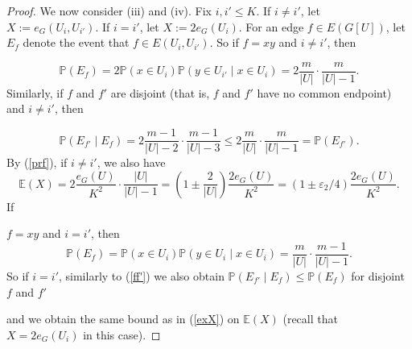 \documentclass{memo-l}
\def\COMMENT#1{}
\def\eps{\varepsilon}
\def\ex{\mathbb{E}}
\def\pr{\mathbb{P}}
\numberwithin{section}{chapter}
\numberwithin{equation}{section}
\numberwithin{firstthm}{section}
\numberwithin{figure}{section}
\begin{document}
\begin{proof}
We now consider (iii) and (iv).
Fix $i,i' \le K$. If $i \neq i'$, let $X:=e_G(U_{i}, U_{i'})$.
If $i = i'$, let $X:=2e_G(U_{i})$.
For an edge $f \in E(G[U])$, let $E_f$ denote the event that $f \in E(U_i, U_{i'})$.
So if $f=xy$ and $i \neq i'$, then%
    \COMMENT{to derive these and other expressions, it's best to view the sample space as the set of all
injective mappings from $U$ to $[|U|]$, where
we assign $x$ to $U_i$ if it is mapped to $[(i-1)m+1,im]$. Then each equipartition has the same number of mappings which produce this equipartition.
So as probability space one can consider the uniform distribution over the above mappings.}
\begin{equation} \label{prf}
\pr (E_f) =2 \pr (x \in U_i) \pr (y \in U_{i'} \mid x \in U_i) = 2 \frac{m}{|U|} \cdot  \frac{m}{|U|-1}.
\end{equation}
Similarly, if $f$ and $f'$ are disjoint (that is, $f$ and $f'$ have no common 
endpoint)\COMMENT{B.Cs: the explanation for disjointness is given here} and $i \neq i'$, then%
   \COMMENT{note $\frac{m-1}{m} \frac{|U|}{|U|-2} \le (1-1/m)(1+3/|U|) \le 1$ and similarly for the second fraction.}
\begin{equation} \label{ff'}
\pr ( E_{f'} \mid E_f )=2\frac{m-1}{|U|-2} \cdot \frac{m-1}{|U|-3} \le 
2\frac{m}{|U|} \cdot \frac{m}{|U|-1} =
\pr ( E_{f'}).
\end{equation}
By (\ref{prf}), if $i \not =i'$, we also have
\begin{equation}  \label{exX}
\ex ( X ) = 2 \frac{e_G(U)}{K^2} \cdot \frac{|U|}{|U|-1}= \left( 1 \pm \frac{2}{|U|} \right) \frac{2e_G(U)}{K^2}= \left( 1 \pm \eps_2/4 \right)\frac{2e_G(U)}{K^2}.
\end{equation}
If%
\COMMENT{Deryk divided by 4 in the final equality as we need this in eq. devex}
$f=xy$ and $i = i'$, then  
\begin{equation} \label{prf2}
\pr (E_f) = \pr (x \in U_i) \pr (y \in U_{i} \mid x \in U_i) =  \frac{m}{|U|} \cdot  \frac{m-1}{|U|-1}.
\end{equation}
So if $i = i'$, similarly to (\ref{ff'}) we also obtain $\pr ( E_{f'} \mid E_f ) \le \pr (E_f)$ for disjoint $f$ and $f'$%
\COMMENT{$\pr ( E_{f'} \mid E_f )=\frac{m-2}{|U|-2} \cdot \frac{m-3}{|U|-3} \le
\frac{m}{|U|} \frac{m-1}{|U|-1} =\pr ( E_{f'}).$}
and we obtain the same bound as in (\ref{exX}) on $\ex ( X )$ (recall that $X=2e_G(U_i)$ in this case).%
     \COMMENT{Daniela added brackets}
 

\end{proof}
\end{document}
